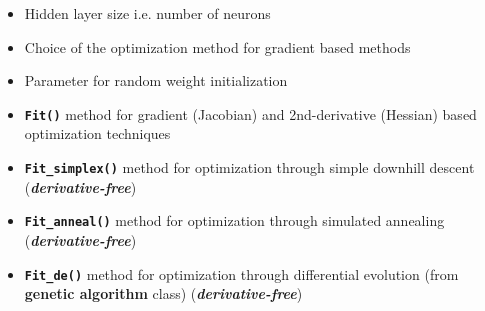 \documentclass[11pt]{article}
\providecommand{\tightlist}{%
      \setlength{\itemsep}{0pt}\setlength{\parskip}{0pt}}
\begin{document}
\begin{itemize}
\tightlist
\item
  Hidden layer size i.e. number of neurons
\item
  Choice of the optimization method for gradient based methods
\item
  Parameter for random weight initialization
\item
  \textbf{\texttt{Fit()}} method for gradient (Jacobian) and
  2nd-derivative (Hessian) based optimization techniques
\item
  \textbf{\texttt{Fit\_simplex()}} method for optimization through
  simple downhill descent (\textbf{\emph{derivative-free}})
\item
  \textbf{\texttt{Fit\_anneal()}} method for optimization through
  simulated annealing (\textbf{\emph{derivative-free}})
\item
  \textbf{\texttt{Fit\_de()}} method for optimization through
  differential evolution (from \textbf{genetic algorithm} class)
  (\textbf{\emph{derivative-free}})
\end{itemize}
\end{document}
